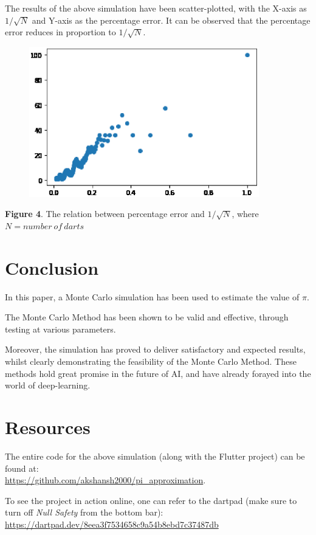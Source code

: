 \documentclass{resonance}
\begin{document}
	The results of the above simulation have been scatter-plotted, with the X-axis as $1/\sqrt{N}$ and Y-axis as the percentage error. It can be observed that the percentage error reduces in proportion to $1/\sqrt{N}$.
	
	\begin{figure}[H]
		\includegraphics[width=10cm]{error-plot}
	\end{figure}
	\vspace{-10pt}\hspace{10pt}\scriptsize{\textbf{Figure 4}. The relation between percentage error and $1/\sqrt{N}$, where $N = number\ of\ darts$}

	\normalsize
	\section{Conclusion}
	In this paper, a Monte Carlo simulation has been used to estimate the value of $\pi$.
	
	The Monte Carlo Method has been shown to be valid and effective, through testing at various parameters.
	
	Moreover, the simulation has proved to deliver satisfactory and expected results, whilst clearly demonstrating the feasibility of the Monte Carlo Method. These methods hold great promise in the future of AI, and have already forayed into the world of deep-learning.
	
	\section{Resources}
	The entire code for the above simulation (along with the Flutter project) can be found at:\\ \textcolor{blue}{\url{https://github.com/akshansh2000/pi_approximation}}.
	
	To see the project in action online, one can refer to the dartpad (make sure to turn off \emph{Null Safety} from the bottom bar):\\
	\textcolor{blue}{\url{https://dartpad.dev/8eea3f7534658c9a54b8ebd7c37487db}}
	
\end{document}
